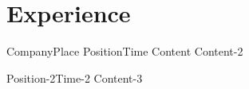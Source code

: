 \section{Experience}
	\resumeSubHeadingListStart
		\resumeSubheading
			{Company}{Place}
			{Position}{Time}
			\resumeItemListStart
					{Content}
					{Content-2}
			\resumeItemListEnd
			
		\resumeSubSubheading
			{Position-2}{Time-2}
			\resumeItemListStart
					{Content-3}
			\resumeItemListEnd
	\resumeSubHeadingListEnd

